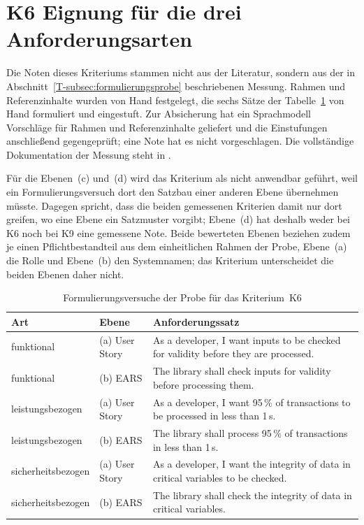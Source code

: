 \documentclass[11pt,a4paper]{report}
\begin{document}
\section{K6 Eignung für die drei Anforderungsarten}
\label{sec:anhang-k6}

Die Noten dieses Kriteriums stammen nicht aus der Literatur, sondern aus
der in Abschnitt~\ref{T-subsec:formulierungsprobe} beschriebenen Messung.
Rahmen und Referenzinhalte wurden von Hand festgelegt, die sechs
Sätze der Tabelle~\ref{tab:anhang-k6-versuche} von Hand formuliert
und eingestuft. Zur Absicherung hat ein Sprachmodell
Vorschläge für Rahmen und Referenzinhalte geliefert und die
Einstufungen anschließend gegengeprüft; eine Note hat es nicht
vorgeschlagen. Die vollständige Dokumentation der Messung
steht in .

Für die Ebenen~(c) und~(d) wird das Kriterium als nicht anwendbar
geführt, weil ein Formulierungsversuch dort den Satzbau einer anderen
Ebene übernehmen müsste. Dagegen spricht, dass die beiden gemessenen
Kriterien damit nur dort greifen, wo eine Ebene ein Satzmuster vorgibt;
Ebene~(d) hat deshalb weder bei K6 noch bei K9 eine gemessene Note.
Beide bewerteten Ebenen beziehen zudem je einen Pflichtbestandteil aus
dem einheitlichen Rahmen der Probe, Ebene~(a) die Rolle und Ebene~(b)
den Systemnamen; das Kriterium unterscheidet die beiden Ebenen daher
nicht.

\begin{table}[htbp]
  \centering
  \caption{Formulierungsversuche der Probe für das Kriterium~K6}
  \label{tab:anhang-k6-versuche}
  \begin{tabular}{@{}>{\raggedright\arraybackslash}p{2.2cm}%
                    >{\raggedright\arraybackslash}p{2.2cm}%
                    >{\raggedright\arraybackslash}p{7.4cm}@{}}
    \toprule
    \textbf{Art} & \textbf{Ebene} & \textbf{Anforderungssatz} \\
    \midrule
    funktional & (a) User Story &
    As a developer, I want inputs to be checked for validity before they
    are processed. \\
    funktional & (b) EARS &
    The library shall check inputs for validity before processing
    them. \\
    \addlinespace
    leistungs\-bezogen & (a) User Story &
    As a developer, I want 95\,\% of transactions to be processed in
    less than 1\,s. \\
    leistungs\-bezogen & (b) EARS &
    The library shall process 95\,\% of transactions in less than
    1\,s. \\
    \addlinespace
    sicherheits\-bezogen & (a) User Story &
    As a developer, I want the integrity of data in critical variables
    to be checked. \\
    sicherheits\-bezogen & (b) EARS &
    The library shall check the integrity of data in critical
    variables. \\
    \bottomrule
  \end{tabular}
\end{table}
\end{document}
